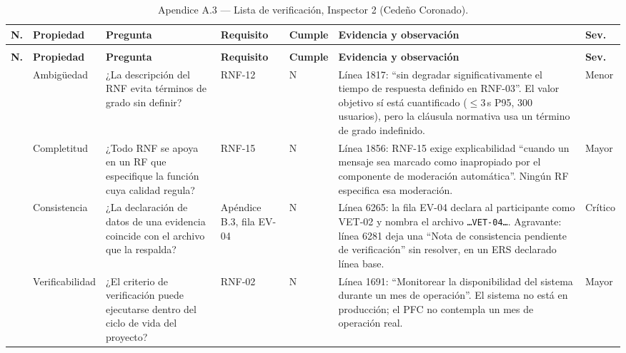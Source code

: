 \documentclass[journal,onecolumn]{IEEEtran}
\begin{document}
	{\scriptsize
		\begin{longtable}{@{}>{\raggedright\arraybackslash}p{0.4cm} >{\raggedright\arraybackslash}p{1.6cm} >{\raggedright\arraybackslash}p{3.0cm} >{\raggedright\arraybackslash}p{2.6cm} >{\raggedright\arraybackslash}p{0.6cm} >{\raggedright\arraybackslash}p{5.4cm} >{\raggedright\arraybackslash}p{1.0cm}@{}}
			\caption{Apendice A.3 --- Lista de verificación, Inspector 2 (Cedeño Coronado).}\label{tab:anexoA3}\\
			\toprule
			\textbf{N.\textordmasculine{}} & \textbf{Propiedad} & \textbf{Pregunta} & \textbf{Requisito} & \textbf{Cumple} & \textbf{Evidencia y observación} & \textbf{Sev.} \\
			\midrule
			\endfirsthead
			\multicolumn{7}{@{}l}{\small\itshape Anexo A.3 (continuación)}\\
			\toprule
			\textbf{N.\textordmasculine{}} & \textbf{Propiedad} & \textbf{Pregunta} & \textbf{Requisito} & \textbf{Cumple} & \textbf{Evidencia y observación} & \textbf{Sev.} \\
			\midrule
			\endhead
			\bottomrule
			\endfoot
			1 & Ambigüedad & ¿La descripción del RNF evita términos de grado sin definir? & RNF-12 & N & Línea 1817: ``sin degradar significativamente el tiempo de respuesta definido en RNF-03''. El valor objetivo sí está cuantificado ($\leq$3\,s P95, 300 usuarios), pero la cláusula normativa usa un término de grado indefinido. & Menor \\
			2 & Completitud & ¿Todo RNF se apoya en un RF que especifique la función cuya calidad regula? & RNF-15 & N & Línea 1856: RNF-15 exige explicabilidad ``cuando un mensaje sea marcado como inapropiado por el componente de moderación automática''. Ningún RF especifica esa moderación. & Mayor \\
			3 & Consistencia & ¿La declaración de datos de una evidencia coincide con el archivo que la respalda? & Apéndice B.3, fila EV-04 & N & Línea 6265: la fila EV-04 declara al participante como VET-02 y nombra el archivo \texttt{\ldots{}VET-04\ldots{}}. Agravante: línea 6281 deja una ``Nota de consistencia pendiente de verificación'' sin resolver, en un ERS declarado línea base. & Crítico \\
			4 & Verificabilidad & ¿El criterio de verificación puede ejecutarse dentro del ciclo de vida del proyecto? & RNF-02 & N & Línea 1691: ``Monitorear la disponibilidad del sistema durante un mes de operación''. El sistema no está en producción; el PFC no contempla un mes de operación real. & Mayor \\

\end{longtable}}
\end{document}
